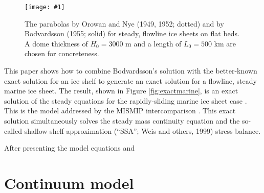 \documentclass[review,letterpaper]{igs}
\newcommand{\onecol}[1]{\texttt{[image: \#1]}}
\begin{document}
\begin{figure}[ht]
\onecol{twoparabolas}
\caption{The parabolas by Orowan and Nye (1949, 1952; dotted) and by Bodvardsson (1955; solid) for steady, flowline ice sheets on flat beds.  A dome thickness of $H_0=3000$ m and a length of $L_0=500$ km are chosen for concreteness.} \label{fig:twoparabolas}
\end{figure}

This paper shows how to combine Bodvardsson's solution with the better-known exact solution for an ice shelf \citep{vanderVeen83,vanderVeen} to generate an exact solution for a flowline, steady marine ice sheet.  The result, shown in Figure \ref{fig:exactmarine}, is an exact solution of the steady equations for the rapidly-sliding marine ice sheet case \citep{SchoofMarine1}.  This is the model addressed by the MISMIP intercomparison \citep{MISMIP2012}.  This exact solution simultaneously solves the steady mass continuity equation and the so-called shallow shelf approximation (``SSA''; Weis and others, 1999)\nocite{WeisGreveHutter} stress balance.

After presenting the model equations and 


\section{Continuum model}
\end{document}
